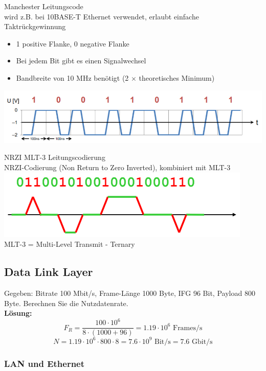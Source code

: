 \begin{concept}{Manchester Leitungscode}\\
    wird z.B. bei 10BASE-T Ethernet verwendet, erlaubt einfache Taktrückgewinnung
    \begin{itemize}
        \item 1 positive Flanke, 0 negative Flanke
        \item Bei jedem Bit gibt es einen Signalwechsel
        \item Bandbreite von 10 MHz benötigt (2 $\times$ theoretisches Minimum)
    \end{itemize}
    \includegraphics[width=0.6\linewidth]{images/leitungscode.png}
\end{concept}

\begin{concept}{NRZI MLT-3 Leitungscodierung}\\
    NRZI-Codierung (Non Return to Zero Inverted), kombiniert mit MLT-3\\
        \includegraphics[width=0.5\linewidth]{images/leitungscodierung.png}\\
    MLT-3 = Multi-Level Transmit - Ternary
\end{concept}

\subsection*{Data Link Layer}

\begin{example}
    Gegeben: Bitrate 100 Mbit/s, Frame-Länge 1000 Byte, IFG 96 Bit, Payload 800 Byte. Berechnen Sie die Nutzdatenrate.\\
    \textbf{Lösung:}\\
    $$F_R = \frac{100 \cdot 10^6}{8 \cdot (1000 + 96)} = 1.19 \cdot 10^6 \text{ Frames/s}$$
    $$N = 1.19 \cdot 10^6 \cdot 800 \cdot 8 = 7.6 \cdot 10^9 \text{ Bit/s} = 7.6 \text{ Gbit/s}$$
\end{example}

\subsubsection*{LAN und Ethernet}

